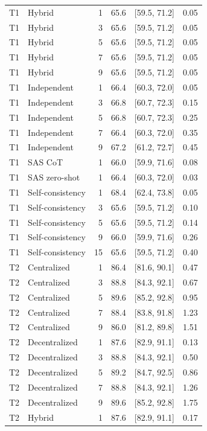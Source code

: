 \begin{tabular}{@{}llrrrr@{}}
T1 & Hybrid & 1 & 65.6 & [59.5, 71.2] & 0.05 \\
T1 & Hybrid & 3 & 65.6 & [59.5, 71.2] & 0.05 \\
T1 & Hybrid & 5 & 65.6 & [59.5, 71.2] & 0.05 \\
T1 & Hybrid & 7 & 65.6 & [59.5, 71.2] & 0.05 \\
T1 & Hybrid & 9 & 65.6 & [59.5, 71.2] & 0.05 \\
T1 & Independent & 1 & 66.4 & [60.3, 72.0] & 0.05 \\
T1 & Independent & 3 & 66.8 & [60.7, 72.3] & 0.15 \\
T1 & Independent & 5 & 66.8 & [60.7, 72.3] & 0.25 \\
T1 & Independent & 7 & 66.4 & [60.3, 72.0] & 0.35 \\
T1 & Independent & 9 & 67.2 & [61.2, 72.7] & 0.45 \\
T1 & SAS CoT & 1 & 66.0 & [59.9, 71.6] & 0.08 \\
T1 & SAS zero-shot & 1 & 66.4 & [60.3, 72.0] & 0.03 \\
T1 & Self-consistency & 1 & 68.4 & [62.4, 73.8] & 0.05 \\
T1 & Self-consistency & 3 & 65.6 & [59.5, 71.2] & 0.10 \\
T1 & Self-consistency & 5 & 65.6 & [59.5, 71.2] & 0.14 \\
T1 & Self-consistency & 9 & 66.0 & [59.9, 71.6] & 0.26 \\
T1 & Self-consistency & 15 & 65.6 & [59.5, 71.2] & 0.40 \\
T2 & Centralized & 1 & 86.4 & [81.6, 90.1] & 0.47 \\
T2 & Centralized & 3 & 88.8 & [84.3, 92.1] & 0.67 \\
T2 & Centralized & 5 & 89.6 & [85.2, 92.8] & 0.95 \\
T2 & Centralized & 7 & 88.4 & [83.8, 91.8] & 1.23 \\
T2 & Centralized & 9 & 86.0 & [81.2, 89.8] & 1.51 \\
T2 & Decentralized & 1 & 87.6 & [82.9, 91.1] & 0.13 \\
T2 & Decentralized & 3 & 88.8 & [84.3, 92.1] & 0.50 \\
T2 & Decentralized & 5 & 89.2 & [84.7, 92.5] & 0.86 \\
T2 & Decentralized & 7 & 88.8 & [84.3, 92.1] & 1.26 \\
T2 & Decentralized & 9 & 89.6 & [85.2, 92.8] & 1.75 \\
T2 & Hybrid & 1 & 87.6 & [82.9, 91.1] & 0.17 \\

\end{tabular}

